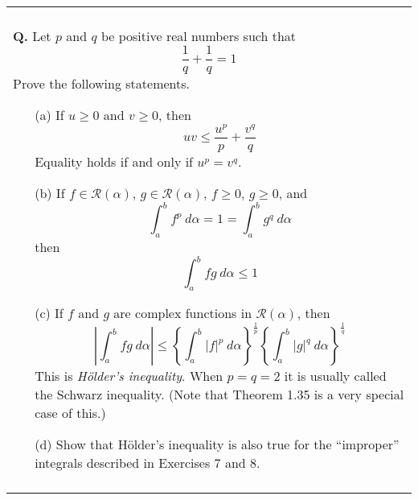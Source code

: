\documentclass{article}
\newenvironment{myboxed}{\noindent\begin{tabular}{|p{.975\linewidth}|}\hline \\}{\\\\\hline\end{tabular}}
\newcounter{Question}
\newenvironment{Question} 
{\bigskip\begin{myboxed}\refstepcounter{Question}\par\noindent\textbf{Q\theQuestion.}}
{\end{myboxed}\bigskip}
\begin{document}
\begin{Question}
    Let $p$ and $q$ be positive real numbers such that
    \[\frac{1}{q} + \frac{1}{q} = 1\]
    Prove the following statements.
    \begin{itemize}
        \item[(a)] 
            If $u \geq 0$ and $v \geq 0$, then
            \[uv \leq \frac{u^p}{p} + \frac{v^q}{q}\]
            Equality holds if and only if $u^p = v^q$.
        \item[(b)]
            If $f \in \mathscr{R}(\alpha)$, $g \in \mathscr{R}(\alpha)$, $f \geq 0$, $g \geq 0$, and
            \[\int_a^b f^p \: d\alpha = 1 = \int_a^b g^q \: d\alpha\]
            then
            \[\int_a^b fg \: d\alpha \leq 1\]
        \item[(c)] 
            If $f$ and $g$ are complex functions in $\mathscr{R}(\alpha)$, then 
            \[\left|\int_a^b fg \: d\alpha\right| \leq \left\{\int_a^b |f|^p \: d\alpha \right\}^{\frac{1}{p}}\left\{\int_a^b |g|^q \: d\alpha\right\}^{\frac{1}{q}}\]
            This is \textit{Hölder's inequality}. When $p = q = 2$ it is usually called the Schwarz inequality. (Note that Theorem 1.35 is a very special case of this.)
        \item[(d)]
            Show that Hölder's inequality is also true for the ``improper'' integrals described in Exercises $7$ and $8$.
    \end{itemize}
\end{Question}
\end{document}
